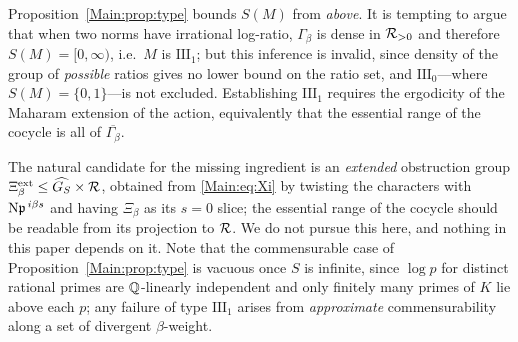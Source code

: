 \begin{remark}\label{Main:rem:typewarning}
Proposition~\ref{Main:prop:type} bounds $S(M)$ from \emph{above}. It is tempting to argue that
when two norms have irrational log-ratio, $\Gamma_\beta$ is dense in $\mathcal{R}_{>0}$ and therefore
$S(M)=[0,\infty)$, i.e.\ $M$ is $\mathrm{III}_1$; but this inference is invalid, since
density of the group of \emph{possible} ratios gives no lower bound on the ratio set, and
$\mathrm{III}_0$---where $S(M)=\{0,1\}$---is not excluded. Establishing $\mathrm{III}_1$
requires the ergodicity of the Maharam extension of the action, equivalently that the
essential range of the cocycle is all of $\overline{\Gamma_\beta}$.

The natural candidate for the missing ingredient is an \emph{extended} obstruction group
$\Xi_\beta^{\mathrm{ext}}\le\widehat{G_S}\times\mathcal{R}$, obtained from \eqref{Main:eq:Xi} by twisting
the characters with $\mathrm{N}\mathfrak{p}^{\,i\beta s}$ and having $\Xi_\beta$ as its $s=0$ slice; the
essential range of the cocycle should be readable from its projection to $\mathcal{R}$. We do not
pursue this here, and nothing in this paper depends on it. Note that the commensurable case
of Proposition~\ref{Main:prop:type} is vacuous once $S$ is infinite, since $\log p$ for distinct
rational primes are $\mathbb{Q}$-linearly independent and only finitely many primes of $K$ lie
above each $p$; any failure of type $\mathrm{III}_1$ arises from \emph{approximate}
commensurability along a set of divergent $\beta$-weight.
\end{remark}

